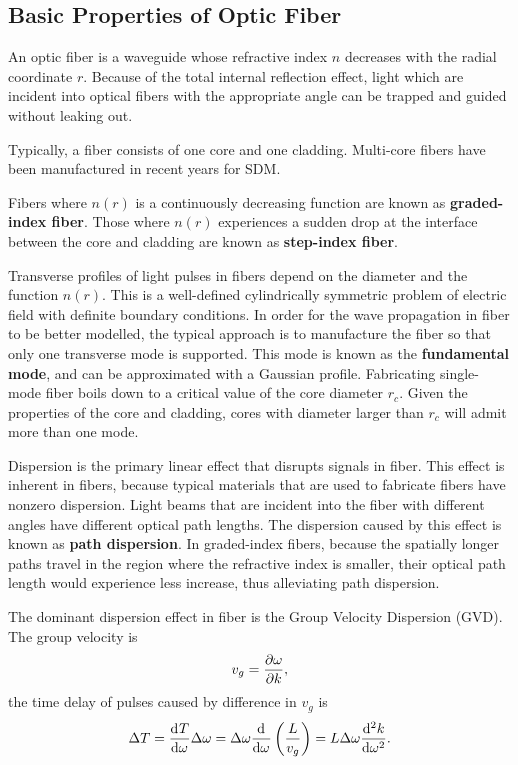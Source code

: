 \documentclass[%
 reprint,
 amsmath,amssymb,
 aps,
]{revtex4-2}
\begin{document}
\subsection{Basic Properties of Optic Fiber}
An optic fiber is a waveguide whose 
refractive index $n$ decreases with the radial coordinate $r$. 
Because of the total internal reflection effect, 
light which are incident into optical fibers 
with the appropriate angle 
can be trapped and guided without leaking out. 
\par
Typically, a fiber consists of one core and one cladding. 
Multi-core fibers have been manufactured 
in recent years for SDM. 
\par
Fibers where $n(r)$ is a continuously decreasing function 
are known as \textbf{graded-index fiber}. 
Those where $n(r)$ experiences a sudden drop at the 
interface between the core and cladding are known as 
\textbf{step-index fiber}. 
\par
Transverse profiles of light pulses in fibers 
depend on the diameter and the function $n(r)$. 
This is a well-defined cylindrically symmetric 
problem of electric field with definite boundary conditions. 
\cite[][\S~2.2.2]{agrawal_fiber-optic_2022}
In order for the wave propagation in fiber to be 
better modelled, the typical approach is to 
manufacture the fiber so that only one transverse mode 
is supported. 
This mode is known as the \textbf{fundamental mode}, 
and can be approximated with a Gaussian profile. 
Fabricating single-mode fiber boils down to a critical value 
of the core diameter $r_{c}$. 
Given the properties of the core and cladding, 
cores with diameter 
larger than $r_{c}$ will admit more than one mode. 
\par
Dispersion is the primary linear effect 
that disrupts signals in fiber. 
This effect is inherent in fibers, 
because typical materials that are used to 
fabricate fibers have nonzero dispersion. 
Light beams that are incident into the fiber 
with different angles have different optical path lengths. 
The dispersion caused by this effect is known as 
\textbf{path dispersion}. 
In graded-index fibers, 
because the spatially longer paths 
travel in the region where the refractive index 
is smaller, their optical path length would experience 
less increase, thus alleviating path dispersion. 
\par
The dominant dispersion effect in fiber 
is the Group Velocity Dispersion (GVD). 
The group velocity is 
\[
    v_{g}=\pdv{\omega}{k},
\]
the time delay of pulses caused by difference in $v_{g}$ is 
\begin{equation}
    \label{eqn:TimeDelayGVD}
    \Delta T
    =
    \dv[]{T}{\omega} \Delta \omega
    =
    \Delta \omega \dv[]{\omega}\left( \frac{L}{v_{g}} \right) 
    =
    L\Delta \omega \dv[2]{k}{\omega}.
\end{equation}
\end{document}
